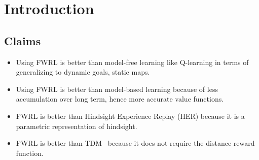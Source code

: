 \documentclass[letterpaper]{article} %
\newcommand{\TODO}[1]{{\color{red}TODO: {#1}}}
\begin{document}
\begin{abstract}
\end{abstract}


\section{ Introduction}




\subsection{Claims}
\begin{itemize} \item
Using FWRL is better than model-free learning like Q-learning in terms of generalizing to dynamic goals, static maps.
\item 
Using FWRL is better than model-based learning because of less accumulation over long term, hence more accurate value functions.
\item FWRL is better than Hindsight Experience Replay (HER) \cite{andrychowicz2016learning} because it is a parametric representation of hindsight.
\item FWRL is better than TDM~\cite{pong2018temporal} because it does not require the distance reward function.
\end{itemize}
\end{document}
